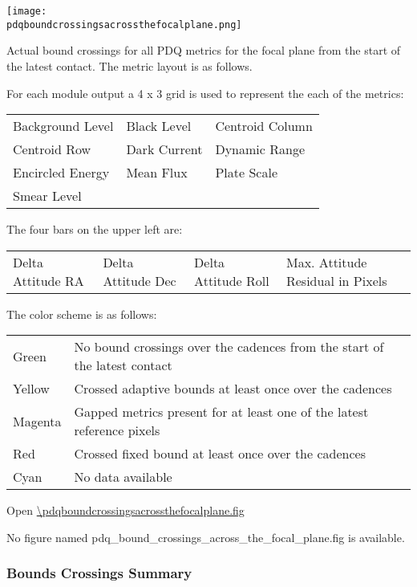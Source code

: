 \ifdefined \pdqboundcrossingsacrossthefocalplane

\begin{center}
  \texttt{[image: \\pdqboundcrossingsacrossthefocalplane.png]}
\end{center}

Actual bound crossings for all PDQ metrics for the focal plane from
the start of the latest contact. The metric layout is as follows.

For each module output a 4 x 3 grid is used to represent the each of
the metrics:

\begin{tabular*}{\tablewidth}{l l l}
  Background Level & Black Level & Centroid Column\\
  Centroid Row & Dark Current & Dynamic Range\\
  Encircled Energy & Mean Flux & Plate Scale\\
  Smear Level\\
\end{tabular*}

The four bars on the upper left are:

\begin{tabular*}{\tablewidth}{l l l l}
  Delta Attitude RA & Delta Attitude Dec & Delta Attitude Roll & Max. Attitude Residual in Pixels\\
\end{tabular*}

The color scheme is as follows:

\begin{tabular*}{\tablewidth}{l l}
  Green & No bound crossings over the cadences from the start of the latest contact\\
  Yellow & Crossed adaptive bounds at least once over the cadences\\
  Magenta & Gapped metrics present for at least one of the latest reference pixels\\
  Red & Crossed fixed bound at least once over the cadences\\
  Cyan & No data available\\
\end{tabular*}

Open \url{\pdqboundcrossingsacrossthefocalplane.fig}

\else
No figure named pdq\_bound\_crossings\_across\_the\_focal\_plane.fig
is available.
\fi

\clearpage

\subsubsection{Bounds Crossings Summary}

